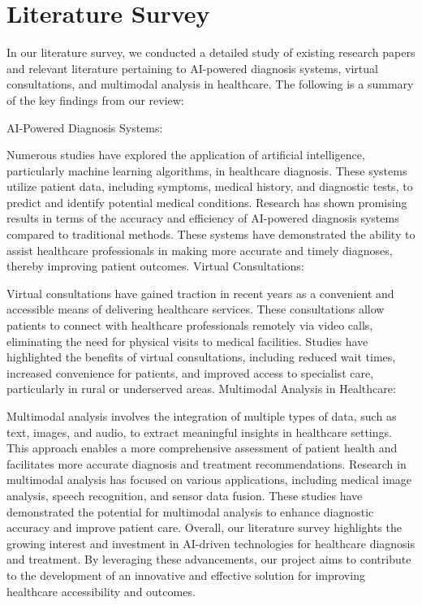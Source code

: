 \documentclass[onecolumn]{article}
\begin{document}
\section{Literature Survey}
In our literature survey, we conducted a detailed study of existing research papers and relevant literature pertaining to AI-powered diagnosis systems, virtual consultations, and multimodal analysis in healthcare. The following is a summary of the key findings from our review:

AI-Powered Diagnosis Systems:

Numerous studies have explored the application of artificial intelligence, particularly machine learning algorithms, in healthcare diagnosis. These systems utilize patient data, including symptoms, medical history, and diagnostic tests, to predict and identify potential medical conditions.
Research has shown promising results in terms of the accuracy and efficiency of AI-powered diagnosis systems compared to traditional methods. These systems have demonstrated the ability to assist healthcare professionals in making more accurate and timely diagnoses, thereby improving patient outcomes.
Virtual Consultations:

Virtual consultations have gained traction in recent years as a convenient and accessible means of delivering healthcare services. These consultations allow patients to connect with healthcare professionals remotely via video calls, eliminating the need for physical visits to medical facilities.
Studies have highlighted the benefits of virtual consultations, including reduced wait times, increased convenience for patients, and improved access to specialist care, particularly in rural or underserved areas.
Multimodal Analysis in Healthcare:

Multimodal analysis involves the integration of multiple types of data, such as text, images, and audio, to extract meaningful insights in healthcare settings. This approach enables a more comprehensive assessment of patient health and facilitates more accurate diagnosis and treatment recommendations.
Research in multimodal analysis has focused on various applications, including medical image analysis, speech recognition, and sensor data fusion. These studies have demonstrated the potential for multimodal analysis to enhance diagnostic accuracy and improve patient care.
Overall, our literature survey highlights the growing interest and investment in AI-driven technologies for healthcare diagnosis and treatment. By leveraging these advancements, our project aims to contribute to the development of an innovative and effective solution for improving healthcare accessibility and outcomes.
\end{document}
